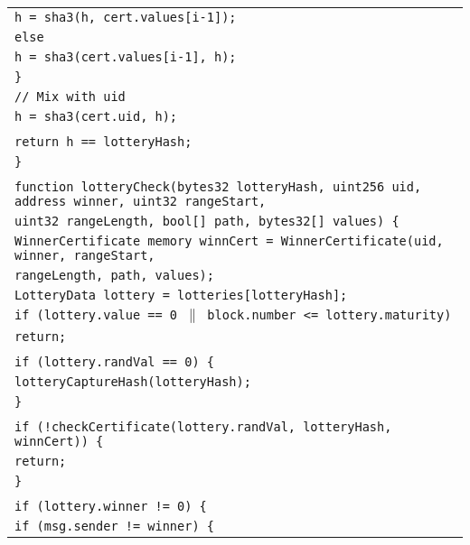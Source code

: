 \documentclass[a4paper]{article}
\begin{document}
\begin{tabularx}{\linewidth}{l}
        \qquad\qquad\qquad\qquad\texttt{h = sha3(h, cert.values[i-1]);}\\
        \qquad\qquad\qquad\texttt{else}\\
        \qquad\qquad\qquad\qquad\texttt{h = sha3(cert.values[i-1], h);}\\
        \qquad\qquad\qquad\texttt{\}}\\
        \qquad\qquad\texttt{// Mix with uid}\\
        \qquad\qquad\texttt{h = sha3(cert.uid, h);}\\
        \\
        \qquad\qquad\texttt{return h == lotteryHash;}\\
        \qquad\texttt{\}}\\
        \\
        \qquad\texttt{function lotteryCheck(bytes32 lotteryHash, uint256 uid, address winner, uint32 rangeStart,}\\
        \qquad\qquad\qquad\qquad\texttt{uint32 rangeLength, bool[] path, bytes32[] values) \{}\\
        \qquad\qquad\texttt{WinnerCertificate memory winnCert = WinnerCertificate(uid, winner, rangeStart,}\\
        \qquad\qquad\qquad\qquad\qquad\qquad\qquad\texttt{rangeLength, path, values);}\\
        \qquad\qquad\texttt{LotteryData lottery = lotteries[lotteryHash];}\\
        \qquad\qquad\texttt{if (lottery.value == 0 $\|$ block.number <= lottery.maturity)}\\
        \qquad\qquad\qquad\texttt{return;}\\
        \\
        \qquad\qquad\texttt{if (lottery.randVal == 0) \{}\\
        \qquad\qquad\qquad\texttt{lotteryCaptureHash(lotteryHash);}\\
        \qquad\qquad\texttt{\}}\\
        \\
        \qquad\qquad\texttt{if (!checkCertificate(lottery.randVal, lotteryHash, winnCert)) \{}\\
        \qquad\qquad\qquad\texttt{return;}\\
        \qquad\qquad\texttt{\}}\\
        \\
        \qquad\qquad\texttt{if (lottery.winner != 0) \{}\\
        \qquad\qquad\qquad\texttt{if (msg.sender != winner) \{}\\

\end{tabularx}
\end{document}
